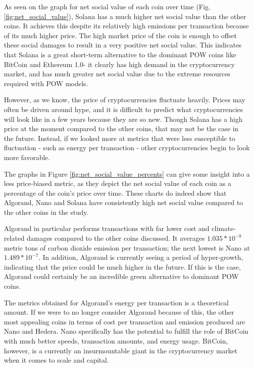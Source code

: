 \documentclass{article}
\begin{document}
As seen on the graph for net social value of each coin over time (Fig. \ref{fig:net_social_value}), Solana has a much higher net social value than the other coins. It achieves this despite its relatively high emissions per transaction because of its much higher price. The high market price of the coin is enough to offset these social damages to result in a very positive net social value. This indicates that Solana is a great short-term alternative to the dominant POW coins like BitCoin and Ethereum 1.0- it clearly has high demand in the cryptocurrency market, and has much greater net social value due to the extreme resources required with POW models.

However, as we know, the price of cryptocurrencies fluctuate heavily. Prices may often be driven around hype, and it is difficult to predict what cryptocurrencies will look like in a few years because they are so new. Though Solana has a high price at the moment compared to the other coins, that may not be the case in the future. Instead, if we looked more at metrics that were less susceptible to fluctuation - such as energy per transaction - other cryptocurrencies begin to look more favorable. 

The graphs in Figure \ref{fig:net_social_value_percents} can give some insight into a less price-biased metric, as they depict the net social value of each coin as a percentage of the coin's price over time. These charts do indeed show that Algorand, Nano and Solana have consistently high net social value compared to the other coins in the study.

Algorand in particular performs transactions with far lower cost and climate-related damages compared to the other coins discussed. It averages $1.035 * 10^{-9}$ metric tons of carbon dioxide emission per transaction; the next lowest is Nano at $1.489 * 10^{-7}$. In addition, Algorand is currently seeing a period of hyper-growth, indicating that the price could be much higher in the future. If this is the case, Algorand could certainly be an incredible green alternative to dominant POW coins. 

The metrics obtained for Algorand's energy per transaction is a theoretical amount. If we were to no longer consider Algorand because of this, the other most appealing coins in terms of cost per transaction and emission produced are Nano and Hedera. Nano specifically has the potential to fulfill the role of BitCoin with much better speeds, transaction amounts, and energy usage. BitCoin, however, is a currently an insurmountable giant in the cryptocurrency market when it comes to scale and capital. 
\end{document}
